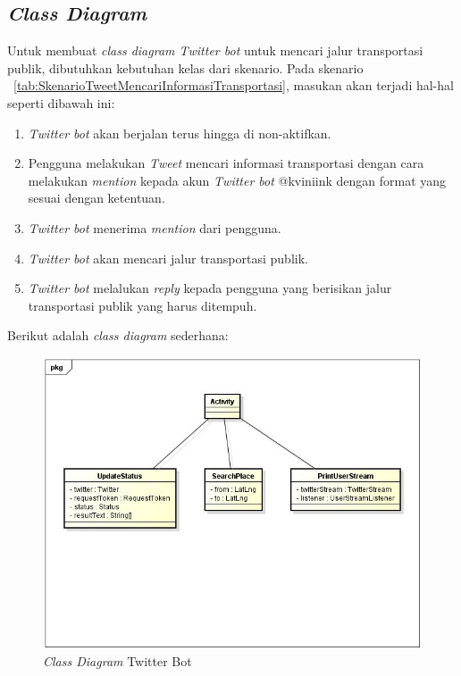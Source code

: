 \subsection{\textit{Class Diagram}}
Untuk membuat \textit{class diagram Twitter bot} untuk mencari jalur transportasi publik, dibutuhkan kebutuhan kelas dari skenario. Pada skenario ~\ref{tab:SkenarioTweetMencariInformasiTransportasi}, masukan akan terjadi hal-hal seperti dibawah ini:
\begin{enumerate}
	\item \textit{Twitter bot} akan berjalan terus hingga di non-aktifkan.
	\item Pengguna melakukan \textit{Tweet} mencari informasi transportasi dengan cara melakukan \textit{mention} kepada akun \textit{Twitter bot} @kviniink dengan format yang sesuai dengan ketentuan.
	\item \textit{Twitter bot} menerima \textit{mention} dari pengguna.
	\item \textit{Twitter bot} akan mencari jalur transportasi publik.
	\item \textit{Twitter bot} melalukan \textit{reply} kepada pengguna yang berisikan jalur transportasi publik yang harus ditempuh. 
\end{enumerate}

Berikut adalah \textit{class diagram} sederhana:
\begin{figure}[htbp]
	\centering
		\includegraphics{Gambar/diagramClass.jpg}
	\caption{\textit{Class Diagram} Twitter Bot}
	\label{fig:classdiagram}
\end{figure}